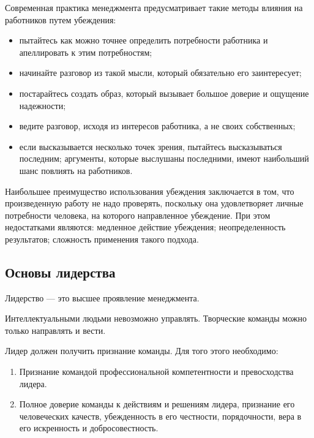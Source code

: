 \documentclass[a4paper,12pt,oneside,final]{extarticle}
\numberwithin{equation}{section}
\begin{document}
Современная практика менеджмента предусматривает такие методы влияния на работников путем убеждения:
\begin{itemize}
	\item пытайтесь как можно точнее определить потребности работника и апеллировать к этим потребностям;
	\item начинайте разговор из такой мысли, который обязательно его заинтересует;
	\item постарайтесь создать образ, который вызывает большое доверие и ощущение надежности;
	\item ведите разговор, исходя из интересов работника, а не своих собственных;
	\item если высказывается несколько точек зрения, пытайтесь высказываться последним; аргументы, которые выслушаны последними, имеют наибольший шанс повлиять на работников.
\end{itemize}

Наибольшее преимущество использования убеждения заключается в том, что произведенную работу не надо проверять, поскольку она удовлетворяет личные потребности человека, на которого направленное убеждение. 
При этом недостатками являются: медленное действие убеждения; неопределенность результатов; сложность применения такого подхода.

\subsection{Основы лидерства}
Лидерство --- это высшее проявление менеджмента.

Интеллектуальными людьми невозможно управлять. 
Творческие команды можно только направлять и вести.

Лидер должен получить признание команды. 
Для того этого необходимо:
\begin{enumerate}
	\item Признание командой профессиональной компетентности и превосходства лидера.
	\item Полное доверие команды к действиям и решениям лидера, признание его человеческих качеств, убежденность в его честности, порядочности, вера в его искренность и добросовестность.
\end{enumerate}
\end{document}
